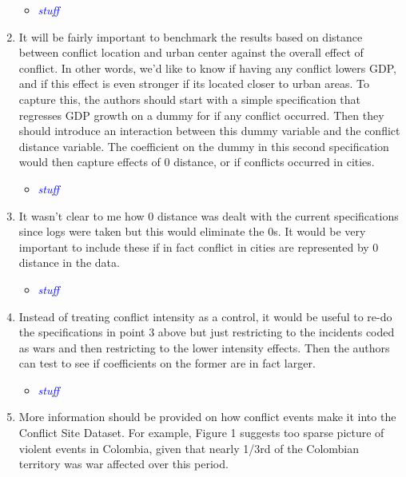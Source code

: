 \documentclass[12pt,onesided,fullpage]{amsart}
\begin{document}
\begin{enumerate}
\begin{itemize}
\item \textcolor{blue}{\emph{stuff}}
\end{itemize}

\item It will be fairly important to benchmark the results based on distance between conflict location and urban center against the overall effect of conflict. In other words, we’d like to know if having any conflict lowers GDP, and if this effect is even stronger if its located closer to urban areas. To capture this, the authors should start with a simple specification that regresses GDP growth on a dummy for if any conflict occurred. Then they should introduce an interaction between this dummy variable and the conflict distance variable. The coefficient on the dummy in this second specification would then capture effects of 0 distance, or if conflicts occurred in cities.

\begin{itemize}
\item \textcolor{blue}{\emph{stuff}}
\end{itemize}

\item It wasn’t clear to me how 0 distance was dealt with the current specifications since logs were taken but this would eliminate the 0s. It would be very important to include these if in fact conflict in cities are represented by 0 distance in the data.

\begin{itemize}
\item \textcolor{blue}{\emph{stuff}}
\end{itemize}

\item Instead of treating conflict intensity as a control, it would be useful to re-do the specifications in point 3 above but just restricting to the incidents coded as wars and then restricting to the lower intensity effects. Then the authors can test to see if coefficients on the former are in fact larger.

\begin{itemize}
\item \textcolor{blue}{\emph{stuff}}
\end{itemize}

\item More information should be provided on how conflict events make it into the Conflict Site Dataset. For example, Figure 1 suggests too sparse picture of violent events in Colombia, given that nearly 1/3rd of the Colombian territory was war affected over this period.


\end{enumerate}
\end{document}
